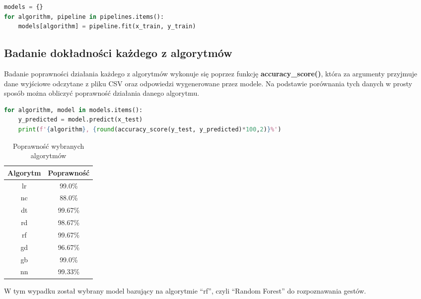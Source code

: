 \begin{lstlisting}[language=python, style=programming, captionpos=b, caption={Trenowanie modeli}]
models = {}
for algorithm, pipeline in pipelines.items():
    models[algorithm] = pipeline.fit(x_train, y_train)
\end{lstlisting}


\subsection{Badanie dokładności każdego z algorytmów}

\quad Badanie poprawności działania każdego z algorytmów wykonuje się poprzez funkcję \textbf{accuracy\_score()}, która za argumenty przyjmuje dane wyjściowe odczytane z pliku CSV oraz odpowiedzi wygenerowane przez modele. Na podstawie porównania tych danych w prosty sposób można obliczyć poprawność działania danego algorytmu.  \newline

\begin{lstlisting}[language=python, style=programming, captionpos=b, caption={Sprawdzenie poprawności}]
for algorithm, model in models.items():
    y_predicted = model.predict(x_test)
    print(f'{algorithm}, {round(accuracy_score(y_test, y_predicted)*100,2)}%')
\end{lstlisting}

\begin{table}[H]
    \begin{center}
        \begin{tabular}{ |c|c| } 
            \hline
            Algorytm & Poprawność \\
            \hline
            lr & 99.0\% \\
            nc & 88.0\% \\
            dt & 99.67\% \\
            rd & 98.67\% \\ 
            rf & 99.67\% \\ 
            gd & 96.67\% \\ 
            gb & 99.0\% \\
            nn & 99.33\% \\ 
            \hline
        \end{tabular}
    \end{center}    
    \caption{Poprawność wybranych algorytmów}
\end{table}

\quad W tym wypadku został wybrany model bazujący na algorytmie \enquote{rf}, czyli \enquote{Random Forest} do rozpoznawania gestów. 

